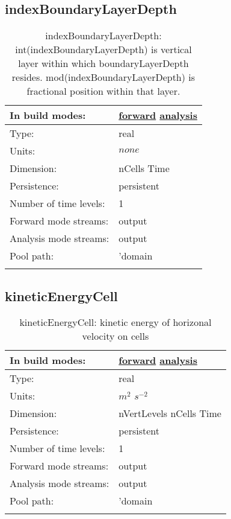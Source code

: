 \subsection[indexBoundaryLayerDepth]{indexBoundaryLayerDepth}
\label{subsec:var_sec_diagnostics_indexBoundaryLayerDepth}
\begin{center}
\begin{longtable}{| p{2.0in} | p{4.0in} |}
        \hline 
        In build modes: & \hyperref[subsec:forward_var_tab_diagnostics]{forward} \hyperref[subsec:analysis_var_tab_diagnostics]{analysis} \\
        \hline 
        Type: & real \\
        \hline 
        Units: & $none$ \\
        \hline 
        Dimension: & nCells Time \\
        \hline 
        Persistence: & persistent \\
        \hline 
        Number of time levels: & 1 \\
        \hline 
		 Forward mode streams: &  output \\
        \hline 
		 Analysis mode streams: &  output \\
        \hline 
            Pool path: & 'domain %
 \\
		 \hline 
    \caption{indexBoundaryLayerDepth: int(indexBoundaryLayerDepth) is vertical layer within which boundaryLayerDepth resides. mod(indexBoundaryLayerDepth) is fractional position within that layer.}
\end{longtable}
\end{center}
\subsection[kineticEnergyCell]{kineticEnergyCell}
\label{subsec:var_sec_diagnostics_kineticEnergyCell}
\begin{center}
\begin{longtable}{| p{2.0in} | p{4.0in} |}
        \hline 
        In build modes: & \hyperref[subsec:forward_var_tab_diagnostics]{forward} \hyperref[subsec:analysis_var_tab_diagnostics]{analysis} \\
        \hline 
        Type: & real \\
        \hline 
        Units: & $m^2$ $s^{-2}$ \\
        \hline 
        Dimension: & nVertLevels nCells Time \\
        \hline 
        Persistence: & persistent \\
        \hline 
        Number of time levels: & 1 \\
        \hline 
		 Forward mode streams: &  output \\
        \hline 
		 Analysis mode streams: &  output \\
        \hline 
            Pool path: & 'domain %
 \\
		 \hline 
    \caption{kineticEnergyCell: kinetic energy of horizonal velocity on cells}
\end{longtable}
\end{center}

